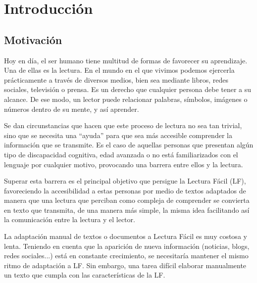 \chapter{Introducción}
\label{cap:introduccion}


\section{Motivación}
Hoy en día, el ser humano tiene multitud de formas de favorecer su aprendizaje. Una de ellas es la lectura. En el mundo en el que vivimos podemos ejercerla prácticamente a través de diversos medios, bien sea mediante libros, redes sociales, televisión o prensa. Es un derecho que cualquier persona debe tener a su alcance. De ese modo, un lector puede relacionar palabras, símbolos, imágenes o números dentro de su mente, y así aprender.


 \setlength{\parskip}{10pt}

 Se dan circunstancias que hacen que este proceso de lectura no sea tan trivial, sino que se necesita una ``ayuda'' para que sea más accesible comprender la información que se transmite. Es el caso de aquellas personas que presentan algún tipo de discapacidad cognitiva, edad avanzada o no está familiarizados con el lenguaje por cualquier motivo, provocando una barrera entre ellos y la lectura.
 
  Superar esta barrera es el principal objetivo que persigue la Lectura Fácil (LF), favoreciendo la accesibilidad a estas personas por medio de textos adaptados de manera que una lectura que perciban como compleja de comprender se convierta en texto que transmita, de una manera más simple, la misma idea facilitando así la comunicación entre la lectura y el lector.
 
 \setlength{\parskip}{10pt}
 

La adaptación manual de textos o documentos a Lectura Fácil es muy costosa y lenta. Teniendo en cuenta que la aparición de nueva información (noticias, blogs, redes sociales...) está en constante crecimiento, se necesitaría mantener el mismo ritmo de adaptación a LF. Sin embargo, una tarea difícil elaborar manualmente un texto que cumpla con las características de la LF. 
 

